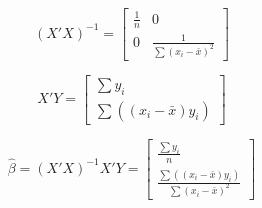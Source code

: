 \documentclass[
]{article}
\begin{document}
\[
(X'X)^{-1} = \begin{bmatrix}
\frac{1}{n} & 0 \\
0 & \frac{1}{\sum (x_i - \bar{x})^2}
\end{bmatrix}
\]

\[
X'Y = \begin{bmatrix}
\sum y_i \\
\sum ((x_i - \bar{x})y_i)
\end{bmatrix}
\]

\[
\hat{\beta} = (X'X)^{-1} X'Y = \begin{bmatrix}
\frac{\sum y_i}{n} \\
\frac{\sum ((x_i - \bar{x})y_i)}{\sum (x_i - \bar{x})^2}
\end{bmatrix}
\]
\end{document}
